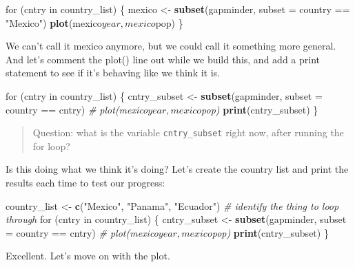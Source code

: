 \documentclass[]{book}
\newenvironment{Shaded}{\begin{snugshade}}{\end{snugshade}}
\newcommand{\KeywordTok}[1]{\textcolor[rgb]{0.13,0.29,0.53}{\textbf{{#1}}}}
\newcommand{\DataTypeTok}[1]{\textcolor[rgb]{0.13,0.29,0.53}{{#1}}}
\newcommand{\StringTok}[1]{\textcolor[rgb]{0.31,0.60,0.02}{{#1}}}
\newcommand{\CommentTok}[1]{\textcolor[rgb]{0.56,0.35,0.01}{\textit{{#1}}}}
\newcommand{\NormalTok}[1]{{#1}}
\theoremstyle{definition}
\theoremstyle{definition}
\theoremstyle{definition}
\theoremstyle{remark}
\begin{document}
\begin{Shaded}
\begin{Highlighting}[]
\NormalTok{for (cntry in country_list) \{}
  \NormalTok{mexico <-}\StringTok{ }\KeywordTok{subset}\NormalTok{(gapminder, }\DataTypeTok{subset =} \NormalTok{country ==}\StringTok{ "Mexico"}\NormalTok{) }
  \KeywordTok{plot}\NormalTok{(mexico$year, mexico$pop)}
\NormalTok{\} }
\end{Highlighting}
\end{Shaded}

We can't call it mexico anymore, but we could call it something more
general. And let's comment the plot() line out while we build this, and
add a print statement to see if it's behaving like we think it is.

\begin{Shaded}
\begin{Highlighting}[]
\NormalTok{for (cntry in country_list) \{}
  \NormalTok{cntry_subset <-}\StringTok{ }\KeywordTok{subset}\NormalTok{(gapminder, }\DataTypeTok{subset =} \NormalTok{country ==}\StringTok{ }\NormalTok{cntry)  }
  \CommentTok{# plot(mexico$year, mexico$pop)}
  \KeywordTok{print}\NormalTok{(cntry_subset)}
\NormalTok{\} }
\end{Highlighting}
\end{Shaded}

\begin{quote}
Question: what is the variable \texttt{cntry\_subset} right now, after
running the for loop?
\end{quote}

Is this doing what we think it's doing? Let's create the country list
and print the results each time to test our progress:

\begin{Shaded}
\begin{Highlighting}[]
\NormalTok{country_list <-}\StringTok{ }\KeywordTok{c}\NormalTok{(}\StringTok{"Mexico"}\NormalTok{, }\StringTok{"Panama"}\NormalTok{, }\StringTok{"Ecuador"}\NormalTok{) }\CommentTok{# identify the thing to loop through}
\NormalTok{for (cntry in country_list) \{}
  \NormalTok{cntry_subset <-}\StringTok{ }\KeywordTok{subset}\NormalTok{(gapminder, }\DataTypeTok{subset =} \NormalTok{country ==}\StringTok{ }\NormalTok{cntry)  }
  \CommentTok{# plot(mexico$year, mexico$pop)}
  \KeywordTok{print}\NormalTok{(cntry_subset)}
\NormalTok{\} }
\end{Highlighting}
\end{Shaded}

Excellent. Let's move on with the plot.
\end{document}
